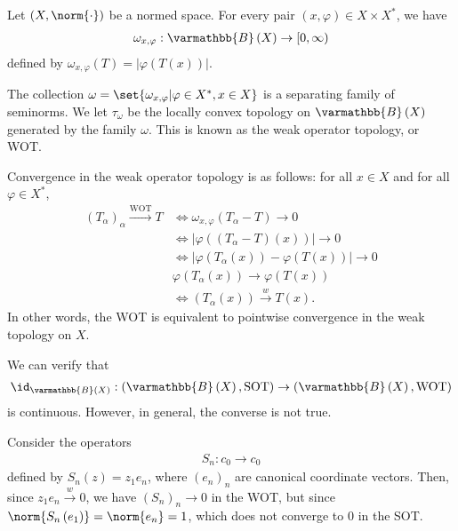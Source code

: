 \documentclass[10pt]{mypackage}
\renewcommand*{\mathbb}[1]{\varmathbb{#1}}
\newcommand{\B}{\mathbb{B}}
\begin{document}
\begin{example}
  Let $\left(X,\norm{\cdot}\right)$ be a normed space. For every pair $\left(x,\varphi\right)\in X\times X^{\ast}$, we have
  \begin{align*}
    \omega_{x,\varphi}: \B\left(X\right)\rightarrow [0,\infty)
  \end{align*}
  defined by $\omega_{x,\varphi}\left(T\right) = \left\vert \varphi\left(T(x)\right) \right\vert$.\newline

  The collection $\omega = \set{\omega_{x,\varphi} | \varphi\in X^{\ast},x\in X}$ is a separating family of seminorms. We let $\tau_{\omega}$ be the locally convex topology on $\B\left(X\right)$ generated by the family $\omega$. This is known as the weak operator topology, or WOT.\newline

  Convergence in the weak operator topology is as follows: for all $x\in X$ and for all $\varphi\in X^{\ast}$,
  \begin{align*}
    \left(T_{\alpha}\right)_{\alpha}\xrightarrow{\text{WOT}} T &\Leftrightarrow \omega_{x,\varphi}\left(T_{\alpha} - T\right) \rightarrow 0\\
                                                               &\Leftrightarrow \left\vert \varphi\left(\left(T_{\alpha} - T\right)\left(x\right)\right) \right\vert\rightarrow 0\\
                                                               &\Leftrightarrow \left\vert \varphi\left(T_{\alpha}\left(x\right)\right) - \varphi\left(T\left(x\right)\right) \right\vert\rightarrow 0\\
                                                               & \varphi\left(T_{\alpha}\left(x\right)\right) \rightarrow \varphi\left(T\left(x\right)\right)\\
                                                               &\Leftrightarrow \left(T_{\alpha}\left(x\right)\right)\xrightarrow{w}T\left(x\right).
  \end{align*}
  In other words, the WOT is equivalent to pointwise convergence in the weak topology on $X$.\newline

  We can verify that
  \begin{align*}
    \id_{\B\left(X\right)}: \left(\B\left(X\right),\text{SOT}\right) \rightarrow \left(\B\left(X\right),\text{WOT}\right)
  \end{align*}
  is continuous. However, in general, the converse is not true.\newline

  Consider the operators
  \begin{align*}
    S_n: c_0 \rightarrow c_0
  \end{align*}
  defined by $S_n(z) = z_1e_n$, where $\left(e_n\right)_n$ are canonical coordinate vectors. Then, since $z_1e_n\xrightarrow{w} 0$, we have $\left(S_n\right)_n\rightarrow 0$ in the WOT, but since $\norm{S_n\left(e_1\right)} = \norm{e_n} = 1$, which does not converge to $0$ in the SOT.
\end{example}
\end{document}
